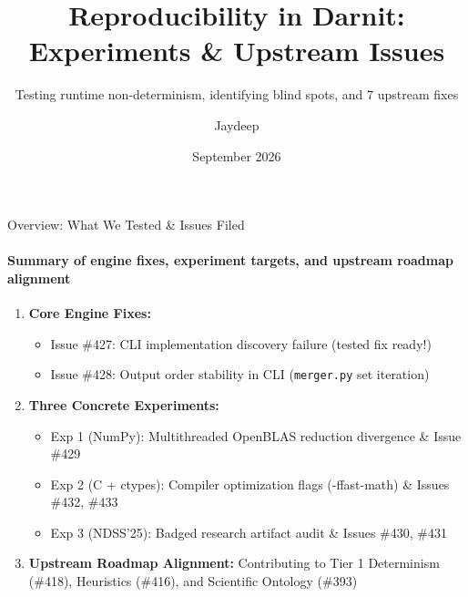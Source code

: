 \documentclass[aspectratio=169]{beamer}
\title[Darnit Reproducibility Evaluation]{Reproducibility in Darnit: Experiments \& Upstream Issues}
\subtitle{Testing runtime non-determinism, identifying blind spots, and 7 upstream fixes}
\author[Jaydeep]{Jaydeep}
\institute[Darnit Community]{Darnit Weekly Community Sync}
\date{September 2026}
\begin{document}
\begin{frame}
    \titlepage
\end{frame}

\begin{frame}{Overview: What We Tested \& Issues Filed}
    \framesubtitle{Summary of engine fixes, experiment targets, and upstream roadmap alignment}
    \begin{enumerate}
        \item \textbf{Core Engine Fixes:}
        \begin{itemize}
            \item Issue \#427: CLI implementation discovery failure (tested fix ready!)
            \item Issue \#428: Output order stability in CLI (\texttt{merger.py} set iteration)
        \end{itemize}
        \item \textbf{Three Concrete Experiments:}
        \begin{itemize}
            \item Exp 1 (NumPy): Multithreaded OpenBLAS reduction divergence \& Issue \#429
            \item Exp 2 (C + ctypes): Compiler optimization flags (-ffast-math) \& Issues \#432, \#433
            \item Exp 3 (NDSS'25): Badged research artifact audit \& Issues \#430, \#431
        \end{itemize}
        \item \textbf{Upstream Roadmap Alignment:} Contributing to Tier 1 Determinism (\#418), Heuristics (\#416), and Scientific Ontology (\#393)
    \end{enumerate}
\end{frame}
\end{document}
